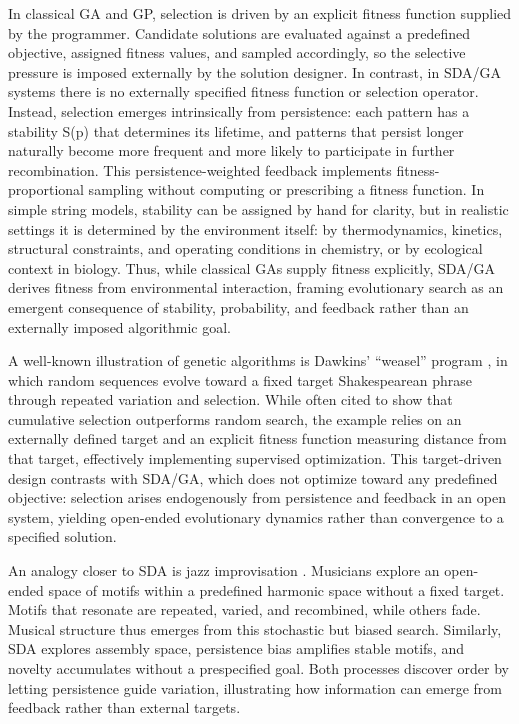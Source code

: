 \documentclass{artificial-life}
\let\cite\citep
\begin{document}
In classical GA and GP, selection is driven by an explicit fitness function supplied by the programmer. Candidate solutions are evaluated against a predefined objective, assigned fitness values, and sampled accordingly, so the selective pressure is imposed externally by the solution designer. In contrast, in SDA/GA systems there is no externally specified fitness function or selection operator. Instead, selection emerges intrinsically from persistence: each pattern has a stability S(p) that determines its lifetime, and patterns that persist longer naturally become more frequent and more likely to participate in further recombination. This persistence-weighted feedback implements fitness-proportional sampling without computing or prescribing a fitness function. In simple string models, stability can be assigned by hand for clarity, but in realistic settings it is determined by the environment itself: by thermodynamics, kinetics, structural constraints, and operating conditions in chemistry, or by ecological context in biology. Thus, while classical GAs supply fitness explicitly, SDA/GA derives fitness from environmental interaction, framing evolutionary search as an emergent consequence of stability, probability, and feedback rather than an externally imposed algorithmic goal.

A well-known illustration of genetic algorithms is Dawkins’ “weasel” program \cite{dawkins1986blind}, in which random sequences evolve toward a fixed target Shakespearean phrase through repeated variation and selection. While often cited to show that cumulative selection outperforms random search, the example relies on an externally defined target and an explicit fitness function measuring distance from that target, effectively implementing supervised optimization. This target-driven design contrasts with SDA/GA, which does not optimize toward any predefined objective: selection arises endogenously from persistence and feedback in an open system, yielding open-ended evolutionary dynamics rather than convergence to a specified solution.

An analogy closer to SDA is jazz improvisation \cite{adler2025jazz}. 
Musicians explore an open-ended space of motifs within a predefined harmonic space
without a fixed target. Motifs that resonate are repeated, varied, and recombined, while others fade. Musical structure thus emerges from this stochastic but biased search. 
Similarly, SDA explores assembly space, persistence bias amplifies
stable motifs, and novelty accumulates without a prespecified goal. 
Both processes discover order by letting persistence guide variation, 
illustrating how information can emerge from feedback rather than
external targets.
\end{document}
